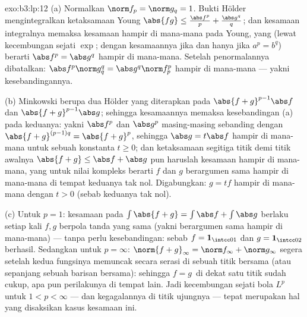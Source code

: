 \begin{solution}{exo:b3:lp:12}
(a) Normalkan $\norm f_p = \norm g_q = 1$. Bukti
Hölder mengintegralkan ketaksamaan Young $\abs{fg} \leq
\frac{\abs f^p}p + \frac{\abs g^q}q$; dan kesamaan
integralnya memaksa kesamaan hampir di mana-mana pada Young, yang (lewat kecembungan
sejati $\exp$; dengan kesamaannya jika dan hanya jika $a^p = b^q$) berarti $\abs
f^p = \abs g^q$ hampir di mana-mana. Setelah penormalannya dibatalkan:
$\abs f^p\norm g_q^q = \abs g^q\norm f_p^p$ hampir di mana-mana ---
yakni kesebandingannya.

(b) Minkowski berupa dua Hölder yang diterapkan pada $\abs{f + g}^{p-1}
\abs f$ dan $\abs{f+g}^{p-1}\abs g$; sehingga kesamaannya memaksa
kesebandingan (a) pada keduanya: yakni $\abs f^p$ dan $\abs g^p$ masing-masing
sebanding dengan $\abs{f+g}^{(p-1)q} = \abs{f+g}^p$, sehingga
$\abs g = t\abs f$ hampir di mana-mana untuk sebuah konstanta $t \geq 0$; dan
ketaksamaan segitiga titik demi titik awalnya $\abs{f + g} \leq
\abs f + \abs g$ pun haruslah kesamaan hampir di mana-mana, yang untuk
nilai kompleks berarti $f$ dan $g$ berargumen sama hampir
di mana-mana di tempat keduanya tak nol. Digabungkan: $g = tf$ hampir di mana-mana
dengan $t > 0$ (sebab keduanya tak nol).

(c) Untuk $p = 1$: kesamaan pada $\int\abs{f + g} = \int\abs f +
\int\abs g$ berlaku setiap kali $f, g$ berpola tanda yang sama
(yakni berargumen sama hampir di mana-mana) --- tanpa perlu kesebandingan:
sebab $f = \mathbf 1_{\intcc01}$ dan $g = \mathbf 1_{\intcc02}$
berhasil. Sedangkan untuk $p = \infty$: $\norm{f+g}_\infty = \norm f_\infty +
\norm g_\infty$ segera setelah kedua fungsinya memuncak
secara serasi di sebuah titik bersama (atau sepanjang sebuah barisan bersama):
sehingga $f = g\,$ di dekat satu titik sudah cukup, apa pun perilakunya
di tempat lain. Jadi kecembungan sejati bola $L^p$ untuk $1 <
p < \infty$ --- dan kegagalannya di titik ujungnya --- tepat
merupakan hal yang disaksikan kasus kesamaan ini.
\end{solution}

